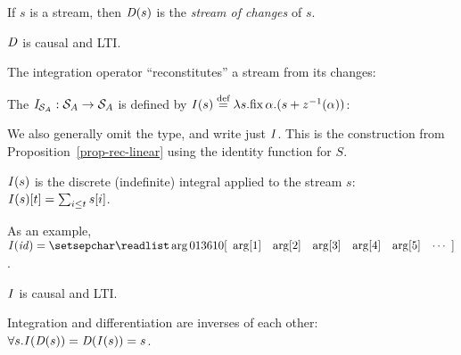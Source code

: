 If $s$ is a stream, then $\mathit{D}(s)$ is the \emph{stream of changes} of $s$.

\begin{proposition}
\label{prop-diff-properties}
$\mathit{D}$ is causal and LTI.
\end{proposition}

The integration operator ``reconstitutes'' a stream from its changes:

\begin{definition}[Integration]
The   $\mathit{I}_{\mathcal{S}_{A}} : \mathcal{S}_{A} \to \mathcal{S}_{A}$
is defined by $\mathit{I}(s) \stackrel{\textrm{\scriptsize def}}{=} \lambda s . \mbox{fix}\,\alpha.(s + z^{-1}(\alpha))$:
\begin{center}
\end{center}
\end{definition}

\noindent
We also generally omit the type, and write just $\mathit{I}$.
This is the construction from Proposition~\ref{prop-rec-linear}
using the identity function for $S$.

\begin{proposition}
$\mathit{I}(s)$ is the discrete (indefinite) integral applied to the stream $s$:
$\mathit{I}(s)[t] = \sum_{i \leq t} s[i]$.
\end{proposition}
\ifstreamexamples
As an example, $\I(\id) = \sv{0 1 3 6 10}$.
\fi

\begin{proposition}
\label{prop-integ-properties}
$\mathit{I}$ is causal and LTI.
\end{proposition}

\begin{theorem}[Inversion]
\label{inverses}
Integration and differentiation are inverses of each other:
$\forall s . \mathit{I}(\mathit{D}(s)) = \mathit{D}(\mathit{I}(s)) = s$.
\end{theorem}

